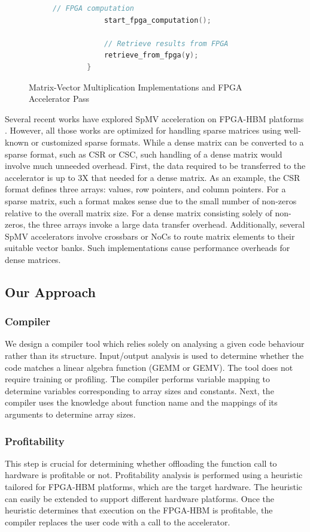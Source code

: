 \documentclass[manuscript,screen,review]{acmart}
\begin{document}
\begin{figure}[h]
\begin{subfigure}[t]{0.45\textwidth}
\begin{lstlisting}[language=C++]
			// FPGA computation
			start_fpga_computation();
			
			// Retrieve results from FPGA
			retrieve_from_fpga(y);
		}
	\end{lstlisting}
\end{subfigure}
\caption{Matrix-Vector Multiplication Implementations and FPGA Accelerator Pass}
\label{fig:mvm_fpga_implementations}
\end{figure}



Several recent works have explored SpMV acceleration on FPGA-HBM platforms \cite{hisparse, graphlily, fccm-spmv, serpens}. However, all those works are optimized for handling sparse matrices using well-known or customized sparse formats. While a dense matrix can be converted to a sparse format, such as CSR or CSC, such handling of a dense matrix would involve much unneeded overhead. First, the data required to be transferred to the accelerator is up to 3X that needed for a dense matrix. As an example, the CSR format defines three arrays: values, row pointers, and column pointers. For a sparse matrix, such a format makes sense due to the small number of non-zeros relative to the overall matrix size. For a dense matrix consisting solely of non-zeros, the three arrays invoke a large data transfer overhead. Additionally, several SpMV accelerators involve crossbars or NoCs to route matrix elements to their suitable vector banks. Such implementations cause performance overheads for dense matrices.

\subsection{Our Approach}
\subsubsection{Compiler} We design a compiler tool which relies solely on analysing a given code behaviour rather than its structure. Input/output analysis is used to determine whether the code matches a linear algebra function (GEMM or GEMV). The tool does not require training or profiling. The compiler performs variable mapping to determine variables corresponding to array sizes and constants. Next, the compiler uses the knowledge about function name and the mappings of its arguments to determine array sizes. 

\subsubsection{Profitability}
This step is crucial for determining whether offloading the function call to hardware is profitable or not. Profitability analysis is performed using a heuristic tailored for FPGA-HBM platforms, which are the target hardware. The heuristic can easily be extended to support different hardware platforms. Once the heuristic determines that execution on the FPGA-HBM is profitable, the compiler replaces the user code with a call to the accelerator.
\end{document}
